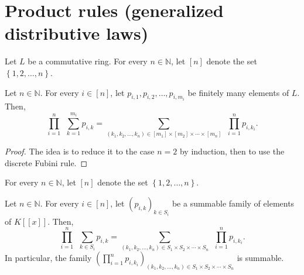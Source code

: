 \section{Product rules (generalized distributive laws)}

\begin{proposition}
\label{prop.fps.prodrule-fin-fin}
\leantarget
\leanok
Let $L$ be a commutative ring. For every
$n\in\mathbb{N}$, let $\left[  n\right]  $ denote the set $\left\{
1,2,\ldots,n\right\}  $.

Let $n\in\mathbb{N}$. For every $i\in\left[  n\right]  $, let $p_{i,1}%
,p_{i,2},\ldots,p_{i,m_{i}}$ be finitely many elements of $L$. Then,%
\begin{equation}
\prod_{i=1}^{n}\ \ \sum_{k=1}^{m_{i}}p_{i,k}=\sum_{\left(  k_{1},k_{2}%
,\ldots,k_{n}\right)  \in\left[  m_{1}\right]  \times\left[  m_{2}\right]
\times\cdots\times\left[  m_{n}\right]  }\ \ \prod_{i=1}^{n}p_{i,k_{i}}.
\label{eq.lem.fps.prodrule-fin-fin.eq}%
\end{equation}
\end{proposition}

\begin{proof}
The idea is to reduce it to the
case $n=2$ by induction, then to use the discrete Fubini rule.
\end{proof}

\begin{proposition}
\label{prop.fps.prodrule-fin-inf}
\leantarget
\leanok
For every $n\in\mathbb{N}$, let $\left[
n\right]  $ denote the set $\left\{  1,2,\ldots,n\right\}  $.

Let $n\in\mathbb{N}$. For every $i\in\left[  n\right]  $, let $\left(
p_{i,k}\right)  _{k\in S_{i}}$ be a summable family of elements of $K\left[
\left[  x\right]  \right]  $. Then,%
\begin{equation}
\prod_{i=1}^{n}\ \ \sum_{k\in S_{i}}p_{i,k}=\sum_{\left(  k_{1},k_{2}%
,\ldots,k_{n}\right)  \in S_{1}\times S_{2}\times\cdots\times S_{n}}%
\ \ \prod_{i=1}^{n}p_{i,k_{i}}. \label{eq.lem.fps.prodrule-fin-inf.eq}%
\end{equation}
In particular, the family $\left(  \prod_{i=1}^{n}p_{i,k_{i}}\right)
_{\left(  k_{1},k_{2},\ldots,k_{n}\right)  \in S_{1}\times S_{2}\times
\cdots\times S_{n}}$ is summable.
\end{proposition}

